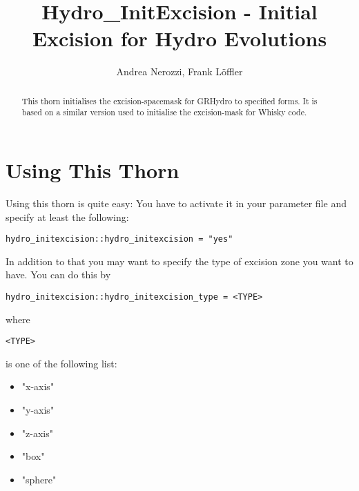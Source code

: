 \documentclass{article}
\begin{document}
\title{Hydro\_InitExcision - Initial Excision for Hydro Evolutions}

\author{Andrea Nerozzi, Frank L\"offler}

\maketitle




\begin{abstract}
  This thorn initialises the excision-spacemask for GRHydro to
  specified forms. It is based on a similar version used to initialise
  the excision-mask for Whisky code.
\end{abstract}


\section{Using This Thorn}

Using this thorn is quite easy:
You have to activate it in your parameter file and specify at least the
following:

\begin{verbatim}
hydro_initexcision::hydro_initexcision = "yes"
\end{verbatim}

In addition to that you may want to specify the type of excision zone
you want to have. You can do this by

\begin{verbatim}
hydro_initexcision::hydro_initexcision_type = <TYPE>
\end{verbatim}

where \begin{verbatim}<TYPE>\end{verbatim} is one of the following list:
\begin{itemize}
 \item "x-axis"
 \item "y-axis"
 \item "z-axis"
 \item "box"
 \item "sphere"
\end{itemize}
\end{document}
